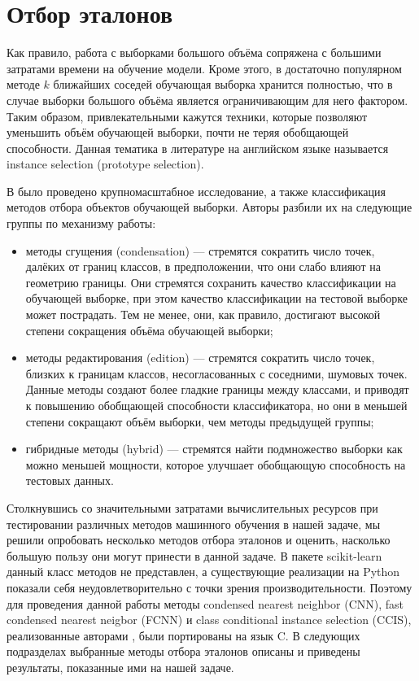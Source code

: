 \section{Отбор эталонов}
Как правило, работа с выборками большого объёма сопряжена с большими затратами времени на обучение модели. Кроме этого, в достаточно популярном методе \(k\) ближайших соседей обучающая выборка хранится полностью, что в случае выборки большого объёма является ограничивающим для него фактором. Таким образом, привлекательными кажутся техники, которые позволяют уменьшить объём обучающей выборки, почти не теряя обобщающей способности. Данная тематика в литературе на английском языке называется instance selection (prototype selection).

В \cite{ps-taxonomy} было проведено крупномасштабное исследование, а также классификация методов отбора объектов обучающей выборки. Авторы разбили их на следующие группы по механизму работы:
\begin{itemize}
    \item методы сгущения (condensation) --- стремятся сократить число точек, далёких от границ классов, в предположении, что они слабо влияют на геометрию границы. Они стремятся сохранить качество классификации на обучающей выборке, при этом качество классификации на тестовой выборке может пострадать. Тем не менее, они, как правило, достигают высокой степени сокращения объёма обучающей выборки;
    \item методы редактирования (edition) --- стремятся сократить число точек, близких к границам классов, несогласованных с соседними, шумовых точек. Данные методы создают более гладкие границы между классами, и приводят к повышению обобщающей способности классификатора, но они в меньшей степени сокращают объём выборки, чем методы предыдущей группы;
    \item гибридные методы (hybrid) --- стремятся найти подмножество выборки как можно меньшей мощности, которое улучшает обобщающую способность на тестовых данных.
\end{itemize}

Столкнувшись со значительными затратами вычислительных ресурсов при тестировании различных методов машинного обучения в нашей задаче, мы решили опробовать несколько методов отбора эталонов и оценить, насколько большую пользу они могут принести в данной задаче. В пакете scikit-learn данный класс методов не представлен, а существующие реализации на Python \cite{scikit-protopy} показали себя неудовлетворительно с точки зрения производительности. Поэтому для проведения данной работы методы condensed nearest neighbor (CNN), fast condensed nearest neigbor (FCNN) и class conditional instance selection (CCIS), реализованные авторами \cite{ps-taxonomy}, были портированы на язык C. В следующих подразделах выбранные методы отбора эталонов описаны и приведены результаты, показанные ими на нашей задаче.

